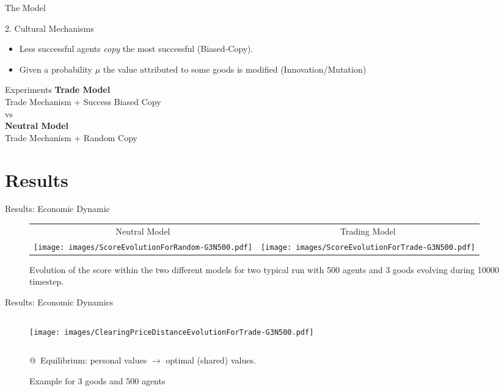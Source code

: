 \documentclass[12pt, notes=show,handout=no]{beamer}
\begin{document}
	\begin{frame}{The Model}
		\begin{block}{2. Cultural Mechanisms}
			\begin{itemize}
					\vfill
				\item Less successful agents \emph{copy} the most successful (Biased-Copy).
					\vfill
				\item Given a probability $\mu$ the value attributed to some goods is modified (Innovation/Mutation)
			\end{itemize}
		\end{block}
	\end{frame}
\begin{frame}{Experiments}
	\centering
	\textbf{Trade Model} \\Trade Mechanism + Success Biased Copy\\
	\vfill
	vs\\
	\vfill
	\textbf{Neutral Model}\\ Trade Mechanism + Random Copy\\
	 

\end{frame}


\section{Results}



\begin{frame}{Results: Economic Dynamic}
    \begin{figure}[!h]
	\centering
	\begin{tabular}{ c c}
	    Neutral Model & Trading Model \\
	    \texttt{[image: images/ScoreEvolutionForRandom-G3N500.pdf]}
	    & \texttt{[image: images/ScoreEvolutionForTrade-G3N500.pdf]}

	\end{tabular}
	\caption{Evolution of the score within the two different models for two typical run with 500 agents and 3 goods evolving during 10000 timestep.}%
	\label{fig:scoreEvol}
    \end{figure}
\end{frame}
    


\begin{frame}{Results: Economic Dynamics}
	\begin{figure}
	    \caption{Example for 3 goods and 500 agents}
	    \begin{columns}
		\texttt{[image: images/ClearingPriceDistanceEvolutionForTrade-G3N500.pdf]}\\
	    \end{columns}
		@~Equilibrium: personal values  $\rightarrow$ optimal (shared) values.
	\end{figure}
	
\end{frame}
\end{document}
